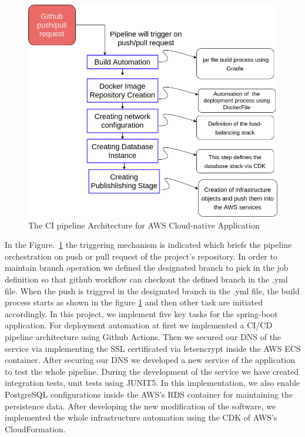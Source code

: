\begin{figure}[h]
\includegraphics[scale=0.60]{images/jahidul/arch_ci_cd.png}
\centering
\caption{The {{CI\CD}} pipeline Architecture for AWS Cloud-native Application}
\label{fig:ci-cd}
\end{figure}

In the Figure.~\ref{fig:ci-cd} the triggering mechanism is indicated which briefs the pipeline orchestration on push or pull request of the project's repository. In order to maintain branch operation we defined the designated branch to pick in the job definition so that github workflow can checkout the defined branch in the {{.yml}} file. When the push is triggred in the designated branch in the {{.yml}} file, the build process starts as shown in the figure \ref{fig:ci-cd} and then other task are initiated accordingly. In this project, we implement five key tasks for the spring-boot application. For deployment automation at first we implemented a CI/CD pipeline architecture using Github Actions. Then we secured our DNS of the service via implementing the SSL certificated via letsencrypt inside the AWS ECS container. After securing our DNS we developed a new service of the application to test the whole pipeline. During the development of the service we have created integration tests, unit tests using JUNIT5. In this implementation, we also enable PostgreSQL configurations inside the AWS's RDS container for maintaining the persistence data. After developing the new modification of the software, we implemented the whole infrastructure automation using the CDK of AWS's CloudFormation.